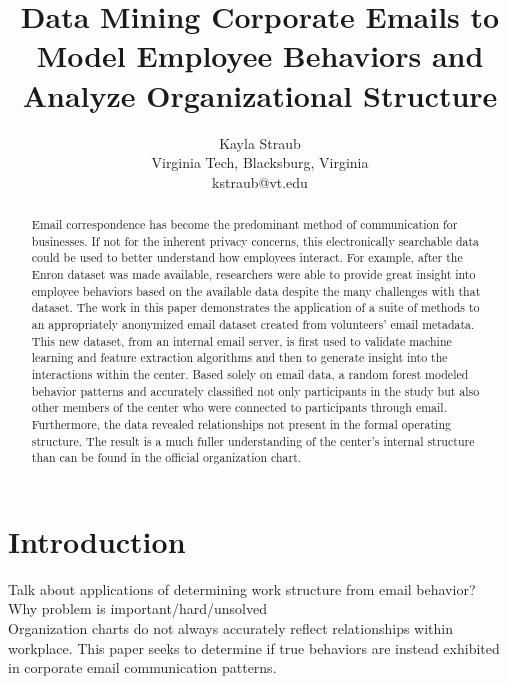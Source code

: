 \documentclass{article}
\begin{document}
\title{Data Mining Corporate Emails to Model Employee Behaviors and Analyze Organizational Structure}
\author{Kayla Straub\\
        Virginia Tech, Blacksburg, Virginia\\
        kstraub@vt.edu}
\maketitle

\begin{abstract}
Email correspondence has become the predominant method of communication for businesses.  If not for the inherent privacy concerns, this electronically searchable data could be used to better understand how employees interact. For example, after the Enron dataset was made available, researchers were able to provide great insight into employee behaviors based on the available data despite the many challenges with that dataset.  The work in this paper demonstrates the application of a suite of methods to an appropriately anonymized email dataset created from volunteers' email metadata.  This new dataset, from an internal email server, is first used to validate machine learning and feature extraction algorithms and then to generate insight into the interactions within the center.  Based solely on email data, a random forest  modeled behavior patterns and accurately classified not only participants in the study but also other members of the center who were connected to participants through email.  Furthermore, the data revealed relationships not present in the formal operating structure.  The result is a much fuller understanding of the center's internal structure than can be found in the official organization chart.
\end{abstract}

\section{Introduction}
Talk about applications of determining work structure from email behavior? \\
Why problem is important/hard/unsolved\\

Organization charts do not always accurately reflect relationships within workplace.  This paper seeks to determine if true behaviors are instead exhibited in corporate email communication patterns.
\end{document}

